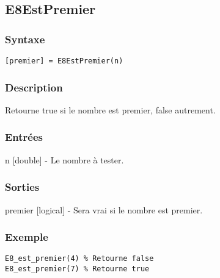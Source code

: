 \begin{minipage}{\linewidth}
\subsection*{E8EstPremier}
\subsubsection*{Syntaxe}
\begin{lstlisting}
[premier] = E8EstPremier(n)
\end{lstlisting}
\subsubsection*{Description}
Retourne true si le nombre est premier, false autrement.
\subsubsection*{Entrées}
\begin{description}
\item n [double] - Le nombre à tester. 
\end{description} \subsubsection*{Sorties}
\begin{description}
\item premier [logical] - Sera vrai si le nombre est premier. 
\end{description} 
\subsubsection*{Exemple}
\begin{lstlisting}
E8_est_premier(4) % Retourne false 
E8_est_premier(7) % Retourne true
\end{lstlisting} \medskip
\end{minipage}